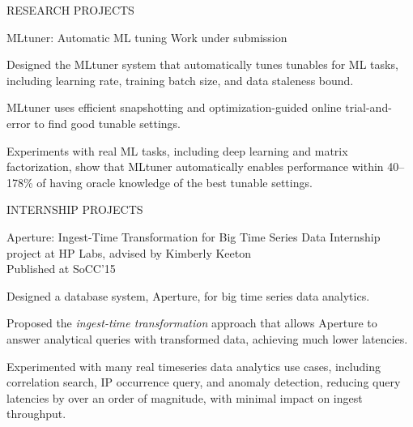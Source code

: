 \documentclass{resume} %
\begin{document}
\begin{rSection}{RESEARCH PROJECTS}
\pagebreak

\begin{rSubsection}{MLtuner: Automatic ML tuning}{}
{Work under submission}{}
\item Designed the MLtuner system that automatically tunes tunables for ML tasks, including learning rate, training batch size, and data staleness bound.
\item MLtuner uses efficient snapshotting and optimization-guided online trial-and-error to find good tunable settings.
\item Experiments with real ML tasks, including deep learning and matrix factorization, show that MLtuner automatically enables performance within 40--178\% of having oracle knowledge of the best tunable settings.
\end{rSubsection}

\end{rSection}


\begin{rSection}{INTERNSHIP PROJECTS}

\begin{rSubsection}{Aperture: Ingest-Time Transformation for Big Time Series Data}{}
{Internship project at HP Labs, advised by Kimberly Keeton\\
Published at SoCC'15}{}
\item Designed a database system, Aperture, for big time series data analytics.
\item Proposed the \emph{ingest-time transformation} approach that allows Aperture to answer analytical queries with transformed data, achieving much lower latencies.
\item Experimented with many real timeseries data analytics use cases, including correlation search, IP occurrence query, and anomaly detection, reducing query latencies by over an order of magnitude, with minimal impact on ingest throughput.
\end{rSubsection}

\end{rSection}
\end{document}
